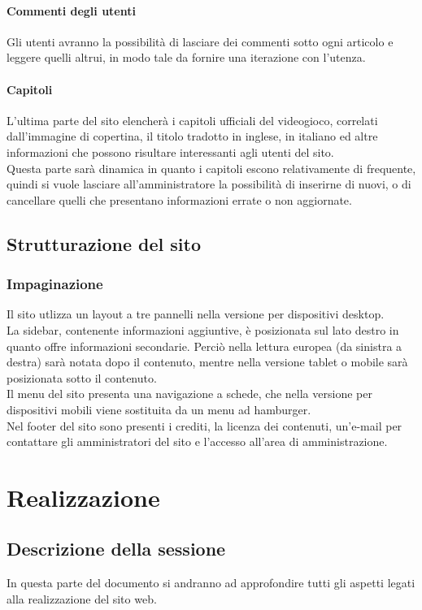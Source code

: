 \documentclass[openany, a4paper, 12pt]{report}
\begin{document}
		\subsubsection{Commenti degli utenti}
		Gli utenti avranno la possibilità di lasciare dei commenti sotto ogni articolo e leggere quelli altrui, in modo tale da fornire una iterazione con l'utenza.

		\subsubsection{Capitoli}
		L'ultima parte del sito elencherà i capitoli ufficiali del videogioco, correlati dall'immagine di copertina, il titolo tradotto in inglese, in italiano ed altre informazioni che possono risultare interessanti agli utenti del sito.\\
		Questa parte sarà dinamica in quanto i capitoli escono relativamente di frequente, quindi si vuole lasciare all'amministratore la possibilità di inserirne di nuovi, o di cancellare quelli che presentano informazioni errate o non aggiornate.

	\section{Strutturazione del sito}
		\subsection{Impaginazione}
		Il sito utlizza un layout a tre pannelli nella versione per dispositivi desktop.\\
		La sidebar, contenente informazioni aggiuntive, è posizionata sul lato destro in quanto offre informazioni secondarie. Perciò nella lettura europea (da sinistra a destra) sarà notata dopo il contenuto, mentre nella versione tablet o mobile sarà posizionata sotto il contenuto.\\
		Il menu del sito presenta una navigazione a schede, che nella versione per dispositivi mobili viene sostituita da un menu ad hamburger.\\
		Nel footer del sito sono presenti i crediti, la licenza dei contenuti, un'e-mail per contattare gli amministratori del sito e l'accesso all'area di amministrazione.

	\chapter{Realizzazione}
		\section{Descrizione della sessione}
		In questa parte del documento si andranno ad approfondire tutti gli aspetti legati alla realizzazione del sito web.
\end{document}
